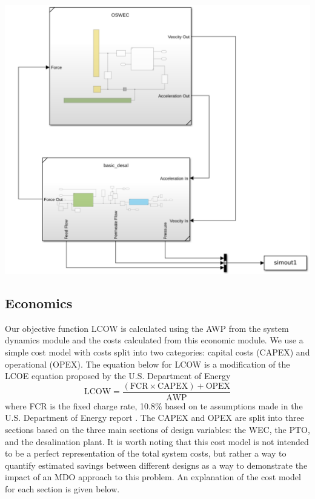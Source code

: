 \documentclass[twocolumn,10pt]{asme2e}
\begin{document}
\begin{center}
    \includegraphics[width=\linewidth]{../figs/coupledsimscape.pdf}
    \label{fig:coupled_system}
\end{center}

\subsection{Economics} \label{sec:econ}

Our objective function LCOW is calculated using the AWP from the system dynamics module and the costs calculated from this economic module. We use a simple cost model with costs split into two categories: capital costs (CAPEX) and operational (OPEX). The equation below for LCOW is a modification of the LCOE equation proposed by the U.S. Department of Energy \cite{LCOE_DOE}
\begin{equation}
    \text{LCOW} = \frac{(\text{FCR}\times\text{CAPEX}) + \text{OPEX}}{\text{AWP}}
\end{equation}
where FCR is the fixed charge rate, 10.8\% based on te assumptions made in the U.S. Department of Energy report \cite{LCOE_DOE}. The CAPEX and OPEX are split into three sections based on the three main sections of design variables: the WEC, the PTO, and the desalination plant. It is worth noting that this cost model is not intended to be a perfect representation of the total system costs, but rather a way to quantify estimated savings between different designs as a way to demonstrate the impact of an MDO approach to this problem. An explanation of the cost model for each section is given below.
\end{document}
